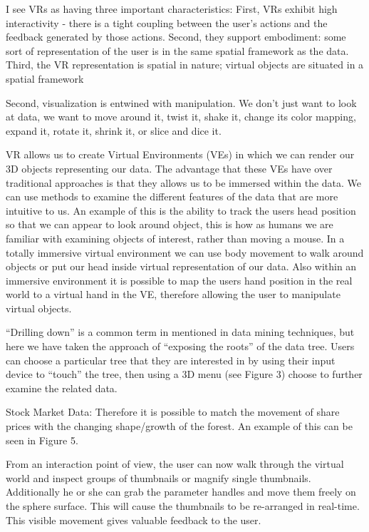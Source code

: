 I see VRs as having three important characteristics: First, VRs exhibit high interactivity - there is a tight coupling between the user's actions and the feedback generated by those actions. Second, they support embodiment: some sort of representation of the user is in the same spatial framework as the data. Third, the VR representation is spatial in nature; virtual objects are situated in a spatial framework
\cite{Stone1994}

Second, visualization is entwined with manipulation. We don't just want to look at data, we want to move around it, twist it, shake it, change its color mapping, expand it, rotate it, shrink it, or slice and dice it.
\cite{Stone1994}

VR allows us to create Virtual Environments (VEs) in which we can render our 3D objects representing our data. The advantage that these VEs have over traditional approaches is that they allows us to be immersed within the data. We can use methods to examine the different features of the data that are more intuitive to us. An example of this is the ability to track the users head position so that we can appear to look around object, this is how as humans we are familiar with examining objects of interest, rather than moving a mouse. In a totally immersive virtual environment we can use body movement to walk around objects or put our head inside virtual representation of our data. Also within an immersive environment it is possible to map the users hand position in the real world to a virtual hand in the VE, therefore allowing the user to manipulate virtual objects.
\cite{Jamieson2007}

“Drilling down” is a common term in mentioned in data mining techniques, but here we have taken the approach of “exposing the roots” of the data tree. Users can choose a particular tree that they are interested in by using their input device to “touch” the tree, then using a 3D menu (see Figure 3) choose to further examine the related data.
\cite{Jamieson2007}

Stock Market Data: Therefore it is possible to match the movement of share prices with the changing shape/growth of the forest. An example of this can be seen in Figure 5.
\cite{Jamieson2007}

From an interaction point of view, the user can now walk through the virtual world and inspect groups of
thumbnails or magnify single thumbnails. Additionally he or she can grab the parameter handles and move them freely on the sphere surface. This will cause the thumbnails to be re-arranged in real-time. This visible movement gives valuable feedback to the user.
\cite{Soldati2007}

